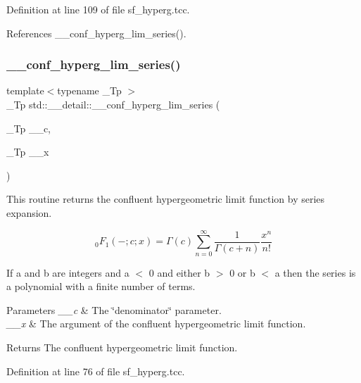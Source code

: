 Definition at line 109 of file sf\+\_\+hyperg.\+tcc.



References \+\_\+\+\_\+conf\+\_\+hyperg\+\_\+lim\+\_\+series().

\mbox{\label{namespacestd_1_1____detail_a44b73ec79e0a8cfd1f29a21cb39f2bdc}} 
\subsubsection{\texorpdfstring{\+\_\+\+\_\+conf\+\_\+hyperg\+\_\+lim\+\_\+series()}{\_\_conf\_hyperg\_lim\_series()}}
{\footnotesize\ttfamily template$<$typename \+\_\+\+Tp $>$ \\
\+\_\+\+Tp std\+::\+\_\+\+\_\+detail\+::\+\_\+\+\_\+conf\+\_\+hyperg\+\_\+lim\+\_\+series (\begin{DoxyParamCaption}\item[{\+\_\+\+Tp}]{\+\_\+\+\_\+c,  }\item[{\+\_\+\+Tp}]{\+\_\+\+\_\+x }\end{DoxyParamCaption})}



This routine returns the confluent hypergeometric limit function by series expansion. 

\[ {}_0F_1(-;c;x) = \Gamma(c) \sum_{n=0}^{\infty} \frac{1}{\Gamma(c+n)} \frac{x^n}{n!} \]

If a and b are integers and a $<$ 0 and either b $>$ 0 or b $<$ a then the series is a polynomial with a finite number of terms.


\begin{DoxyParams}{Parameters}
{\em \+\_\+\+\_\+c} & The \char`\"{}denominator\char`\"{} parameter. \\
\hline
{\em \+\_\+\+\_\+x} & The argument of the confluent hypergeometric limit function. \\
\hline
\end{DoxyParams}
\begin{DoxyReturn}{Returns}
The confluent hypergeometric limit function. 
\end{DoxyReturn}


Definition at line 76 of file sf\+\_\+hyperg.\+tcc.



